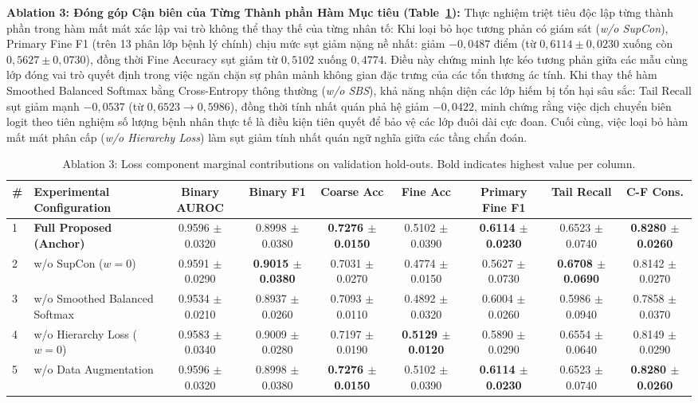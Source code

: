 \documentclass[runningheads]{llncs}
\begin{document}
\noindent \textbf{Ablation 3: Đóng góp Cận biên của Từng Thành phần Hàm Mục tiêu (Table~\ref{tab:ablation_loss_components}):} 
Thực nghiệm triệt tiêu độc lập từng thành phần trong hàm mất mát xác lập vai trò không thể thay thế của từng nhân tố:
Khi loại bỏ học tương phản có giám sát (\textit{w/o SupCon}), Primary Fine F1 (trên 13 phân lớp bệnh lý chính) chịu mức sụt giảm nặng nề nhất: giảm $-0{,}0487$ điểm (từ $0{,}6114 \pm 0{,}0230$ xuống còn $0{,}5627 \pm 0{,}0730$), đồng thời Fine Accuracy sụt giảm từ $0{,}5102$ xuống $0{,}4774$. Điều này chứng minh lực kéo tương phản giữa các mẫu cùng lớp đóng vai trò quyết định trong việc ngăn chặn sự phân mảnh không gian đặc trưng của các tổn thương ác tính.
Khi thay thế hàm Smoothed Balanced Softmax bằng Cross-Entropy thông thường (\textit{w/o SBS}), khả năng nhận diện các lớp hiếm bị tổn hại sâu sắc: Tail Recall sụt giảm mạnh $-0{,}0537$ (từ $0{,}6523 \to 0{,}5986$), đồng thời tính nhất quán phả hệ giảm $-0{,}0422$, minh chứng rằng việc dịch chuyển biên logit theo tiên nghiệm số lượng bệnh nhân thực tế là điều kiện tiên quyết để bảo vệ các lớp đuôi dài cực đoan. Cuối cùng, việc loại bỏ hàm mất mát phân cấp (\textit{w/o Hierarchy Loss}) làm sụt giảm tính nhất quán ngữ nghĩa giữa các tầng chẩn đoán.

\begin{table}[t]
\centering
\caption{Ablation 3: Loss component marginal contributions on validation hold-outs. Bold indicates highest value per column.}
\label{tab:ablation_loss_components}
\begin{adjustbox}{max width=\textwidth}
\begin{tabular}{llccccccc}
\toprule
\textbf{\#} & \textbf{Experimental Configuration} & \textbf{Binary AUROC} & \textbf{Binary F1} & \textbf{Coarse Acc} & \textbf{Fine Acc} & \textbf{Primary Fine F1} & \textbf{Tail Recall} & \textbf{C-F Cons.} \\
\midrule
1 & \textbf{Full Proposed (Anchor)} & 0.9596 $\pm$ 0.0320 & 0.8998 $\pm$ 0.0380 & \textbf{0.7276 $\pm$ 0.0150} & 0.5102 $\pm$ 0.0390 & \textbf{0.6114 $\pm$ 0.0230} & 0.6523 $\pm$ 0.0740 & \textbf{0.8280 $\pm$ 0.0260} \\
2 & w/o SupCon ($w=0$) & 0.9591 $\pm$ 0.0290 & \textbf{0.9015 $\pm$ 0.0380} & 0.7031 $\pm$ 0.0270 & 0.4774 $\pm$ 0.0150 & 0.5627 $\pm$ 0.0730 & \textbf{0.6708 $\pm$ 0.0690} & 0.8142 $\pm$ 0.0270 \\
3 & w/o Smoothed Balanced Softmax & 0.9534 $\pm$ 0.0210 & 0.8937 $\pm$ 0.0260 & 0.7093 $\pm$ 0.0110 & 0.4892 $\pm$ 0.0320 & 0.6004 $\pm$ 0.0260 & 0.5986 $\pm$ 0.0940 & 0.7858 $\pm$ 0.0370 \\
4 & w/o Hierarchy Loss ($w=0$) & 0.9583 $\pm$ 0.0340 & 0.9009 $\pm$ 0.0280 & 0.7197 $\pm$ 0.0190 & \textbf{0.5129 $\pm$ 0.0120} & 0.5890 $\pm$ 0.0290 & 0.6554 $\pm$ 0.0640 & 0.8149 $\pm$ 0.0290 \\
5 & w/o Data Augmentation & 0.9596 $\pm$ 0.0320 & 0.8998 $\pm$ 0.0380 & \textbf{0.7276 $\pm$ 0.0150} & 0.5102 $\pm$ 0.0390 & \textbf{0.6114 $\pm$ 0.0230} & 0.6523 $\pm$ 0.0740 & \textbf{0.8280 $\pm$ 0.0260} \\
\bottomrule
\end{tabular}
\end{adjustbox}
\end{table}
\end{document}

